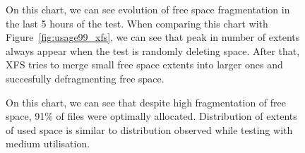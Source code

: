 \documentclass[
  color, %
  table, %
  lof,   %
  lot,   %
]{fithesis3}
\begin{document}
\begin{figure}[h]
    \centering
    \caption[Evolution of free space fragmentation of XFS during testing of high utilisation of HDD]{On this chart, we can see evolution of free space fragmentation in the last 5 hours of the test. When comparing this chart with Figure~\ref{fig:usage99_xfs}, we can see that peak in number of extents always appear when the test is randomly deleting space. After that, XFS tries to merge small free space extents into larger ones and succesfully defragmenting free space.}
    \label{fig:free99_xfs}
\end{figure}

\begin{figure}[h]
    \centering
    \caption[Size distribution of file extents of XFS during testing high utilisation of HDD]{On this chart, we can see that despite high fragmentation of free space, 91\% of files were optimally allocated. Distribution of extents of used space is similar to distribution observed while testing with medium utilisation.}
    \label{fig:used99_xfs}
\end{figure}
\end{document}
